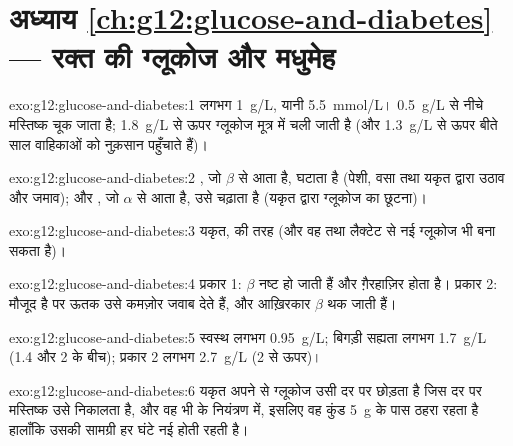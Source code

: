 \section*{अध्याय \ref{ch:g12:glucose-and-diabetes} --- रक्त की ग्लूकोज और मधुमेह}

\begin{solution}{exo:g12:glucose-and-diabetes:1}
लगभग \qty{1}{g/L}, यानी \qty{5.5}{mmol/L}। \qty{0.5}{g/L} से नीचे मस्तिष्क
चूक जाता है; \qty{1.8}{g/L} से ऊपर ग्लूकोज मूत्र में चली जाती है (और
\qty{1.3}{g/L} से ऊपर बीते साल वाहिकाओं को नुक़सान पहुँचाते हैं)।
\end{solution}

\begin{solution}{exo:g12:glucose-and-diabetes:2}
, जो $\beta$  से आता है,  घटाता है (पेशी, वसा तथा
यकृत द्वारा उठाव और जमाव); और , जो $\alpha$  से आता है,
उसे चढ़ाता है (यकृत द्वारा ग्लूकोज का छूटना)।
\end{solution}

\begin{solution}{exo:g12:glucose-and-diabetes:3}
यकृत,  की तरह (और वह  तथा लैक्टेट से नई ग्लूकोज भी बना
सकता है)।
\end{solution}

\begin{solution}{exo:g12:glucose-and-diabetes:4}
प्रकार 1: $\beta$  नष्ट हो जाती हैं और  ग़ैरहाज़िर होता है।
प्रकार 2:  मौजूद है पर ऊतक उसे कमज़ोर जवाब देते हैं, और आख़िरकार
$\beta$  थक जाती हैं।
\end{solution}

\begin{solution}{exo:g12:glucose-and-diabetes:5}
स्वस्थ लगभग \qty{0.95}{g/L}; बिगड़ी सह्यता लगभग \qty{1.7}{g/L}
(1.4 और 2 के बीच); प्रकार 2 लगभग \qty{2.7}{g/L} (2 से ऊपर)।
\end{solution}

\begin{solution}{exo:g12:glucose-and-diabetes:6}
यकृत अपने  से ग्लूकोज उसी दर पर छोड़ता है जिस दर पर मस्तिष्क उसे
निकालता है, और वह भी  के नियंत्रण में, इसलिए वह कुंड \qty{5}{g} के
पास ठहरा रहता है हालाँकि उसकी सामग्री हर घंटे नई होती रहती है।
\end{solution}

